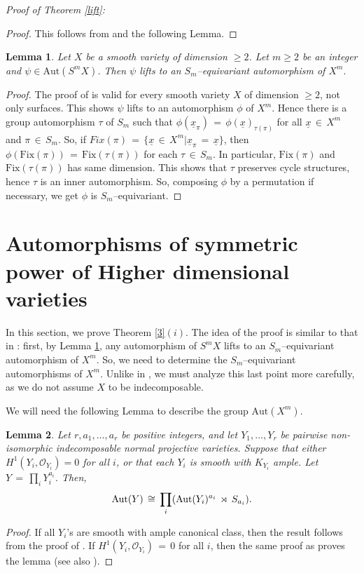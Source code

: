 \documentclass[12pt,reqno]{amsart}
\newtheorem{lemma}{Lemma}[section]
\theoremstyle{definition}
\numberwithin{equation}{section}
\begin{document}
\textit{Proof of Theorem \ref{lift}:}

\begin{proof}
    
This follows from \cite[Proposition 2]{Gir} and the following Lemma.
\end{proof}
\begin{lemma}\label{equivariant}
Let $X$ be a smooth variety of dimension $\geq 2$. Let $m\geq 2$ be an integer and $\psi\in\textrm{Aut}(S^mX)$. Then $\psi$ lifts to an $S_m$--equivariant automorphism of $X^m.$ 
\end{lemma}
\begin{proof}
The proof of {\cite[Proposition 9 and 12]{belmans2020automorphisms}} is valid for every smooth variety $X$ of dimension $\geq 2$, not only surfaces. This shows $\psi$ lifts to an automorphism $\phi$ of $X^m.$ Hence there is a group automorphism $\tau$ of $S_m$ such that $\phi(\underline{x}_{\pi})\,=\,\phi(\underline{x})_{\tau(\pi)}$ for all $\underline{x}\,\in\, X^m$ and $\pi\,\in\, S_m.$ So, if $Fix(\pi)\,=\,\{\underline{x}\,\in\, X^m | \underline{x}_{\pi}\,=\,\underline{x}\}$, then $\phi(\textrm{Fix}(\pi))\,=\,\textrm{Fix}(\tau(\pi))$ for each $\tau\,\in\, S_m.$ In particular, $\textrm{Fix}(\pi)$ and $\textrm{Fix}(\tau(\pi))$ has same dimension. This shows that $\tau$ preserves cycle structures, hence $\tau$ is an inner automorphism. So, composing $\phi$ by a permutation if necessary, we get $\phi$ is $S_m$--equivariant.
\end{proof}

\section{Automorphisms of symmetric power of Higher dimensional varieties}

In this section, we prove Theorem \ref{3}$(i)$. The idea of the proof is similar to that in \cite{Ha}: first, by Lemma \ref{equivariant}, any automorphism of $S^mX$ lifts to an $S_m$--equivariant automorphism of $X^m$. So, we need to determine the $S_m$--equivariant automorphisms of $X^m$. Unlike in \cite{Ha}, we must analyze this last point more carefully, as we do not assume $X$ to be indecomposable. 

We will need the following Lemma to describe the group $\textrm{Aut}(X^m)$.
\begin{lemma}\label{autoproduct}
Let $r, a_{1},\ldots, a_{r}$ be positive integers, and let $Y_{1},\ldots, Y_{r}$ be pairwise non-isomorphic indecomposable normal projective varieties. Suppose that either $H^{1}(Y_{i}, \mathcal{O}_{Y_{i}}) = 0$ for all $i$, or that each $Y_i$ is smooth with $K_{Y_i}$ ample. Let $Y\, =\, \prod _{i} Y_{i}^{a_{i}}$. Then, 
$$\textnormal{Aut}(Y)\, \cong \,\prod_{i}(\textnormal{Aut}(Y_{i})^{a_{i}}\,\rtimes\, S_{a_{i}}).$$
\end{lemma}
\begin{proof}
If all $Y_i$'s are smooth with ample canonical class, then the result follows from the proof of {\cite[Theorem 4.2]{BHPS}}. If $H^{1}(Y_{i}, \mathcal{O}_{Y_{i}}) \,=\, 0$ for all $i$, then the same proof as {\cite[Theorem 2.7, Corollary 2.8]{Ha}} proves the lemma (see also {\cite[Theorem 4.1]{Og}}). 
\end{proof}
\end{document}
